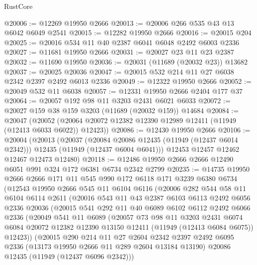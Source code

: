 \begin{lexlean}{RustCore}
\begin{coremodule}
@20006 := @12269 @19950 @2666
@20013 := @20006 @266 @535 @43 @13 @6042 @6049 @2541
@20015 := @12282 @19950 @2666
@20016 := @20015 @204
@20025 := @20016 @534 @11 @40 @2387 @6041 @6048 @2492 @6003 @2336
@20027 := @11681 @19950 @2666
@20031 := @20027 @23 @11 @23 @2387
@20032 := @11690 @19950
@20036 := @20031 (@11689 (@20032 @23)) @13682
@20037 := @20025 @20036
@20047 := @20015 @532 @214 @11 @27 @6038 @2342 @2397 @2492 @6013 @2336
@20049 := @12322 @19950 @2666
@20052 := @20049 @532 @11 @6038
@20057 := @12331 @19950 @2666 @2404 @177 @37
@20064 := @20057 @192 @98 @11 @3203 @2431 @6021 @6033
@20072 := @20027 @159 @38 @159 @3203 (@11689 (@20032 @159)) @14684
@20084 := @20047
    (@20052 (@20064 @20072 @12382 @12390 @12989 @12411 (@11949 (@12413 @6033 @6022)) @12423))
@20086 := @12430 @19950 @2666
@20106 := @20004
    (@20013
      (@20037
        (@20084 @20086 @12435 (@11949 (@12437 @6014 @2342)))
        @12435
        (@11949 (@12437 @6004 @6041)))
      @12453
      @12457
      @12462
      @12467
      @12473
      @12480)
@20118 := @12486 @19950 @2666 @2666 @12490 @6051 @991 @324 @172 @6381 @6734 @2342 @2799
@20235 := @14735
    @19950
    @2666
    @2666
    @171
    @11
    @545
    @990
    @172
    @6118
    @171
    @3239
    @6380
    @6734
    (@12543
      @19950
      @2666
      @545
      @11
      @6104
      @6116
      (@20006
        @282
        @544
        @58
        @11
        @6104
        @6114
        @2611
        (@20016
          @543
          @11
          @43
          @2387
          @6103
          @6113
          @2492
          @6056
          @2336
          @20036
          (@20015
            @541
            @292
            @11
            @40
            @6089
            @6102
            @6112
            @2492
            @6066
            @2336
            (@20049
              @541
              @11
              @6089
              (@20057
                @73
                @98
                @11
                @3203
                @2431
                @6074
                @6084
                @20072
                @12382
                @12390
                @13150
                @12411
                (@11949 (@12413 @6084 @6075))
                @12423))
            (@20015
              @290
              @214
              @11
              @27
              @2604
              @2342
              @2397
              @2492
              @6095
              @2336
              (@13173 @19950 @2666 @11 @289 @2604 @13184 @13190)
              @20086
              @12435
              (@11949 (@12437 @6096 @2342)))

\end{coremodule}
\end{lexlean}
